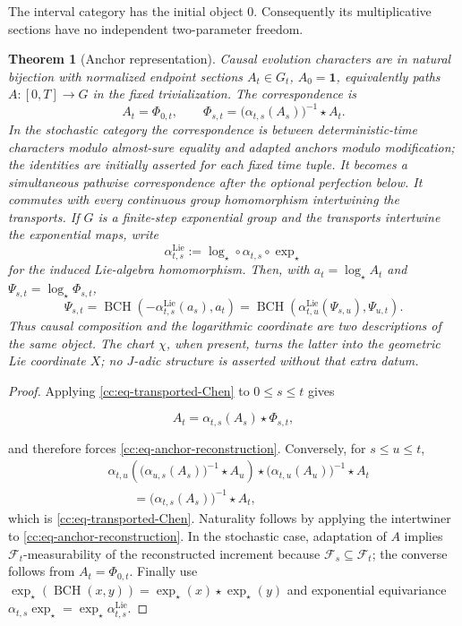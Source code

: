 \documentclass[10pt,reqno]{amsart}
\theoremstyle{plain}
\newtheorem{theorem}{Theorem}[section]
\theoremstyle{definition}
\theoremstyle{remark}
\begin{document}
The interval category has the initial object \(0\).  Consequently its
multiplicative sections have no independent two-parameter freedom.

\begin{theorem}[Anchor representation]
\label{cc:thm-anchor-representation}
Causal evolution characters are in natural bijection with normalized
endpoint sections \(A_t\in G_t\), \(A_0={\mathbf 1}\), equivalently paths
\(A:[0,T]\to G\) in the fixed trivialization.  The correspondence is
\begin{equation}
 A_t=\Phi_{0,t},
 \qquad
 \Phi_{s,t}
 =\bigl(\alpha_{t,s}(A_s)\bigr)^{-1}\star A_t.
 \label{cc:eq-anchor-reconstruction}
\end{equation}
In the stochastic category the correspondence is between deterministic-time
characters modulo almost-sure equality and adapted anchors modulo
modification; the identities are initially asserted for each fixed time
tuple.  It becomes a simultaneous pathwise correspondence after the
optional perfection below.
It commutes with every continuous group homomorphism intertwining the
transports.  If \(G\) is a finite-step exponential group and the transports
intertwine the exponential maps, write
\[
 \alpha^{\mathrm{Lie}}_{t,s}
 :=\log_\star\circ\alpha_{t,s}\circ\exp_\star
\]
for the induced Lie-algebra homomorphism.  Then, with
\(a_t=\log_\star A_t\) and \(\Psi_{s,t}=\log_\star\Phi_{s,t}\),
\begin{equation}
 \Psi_{s,t}
 ={\operatorname{BCH}}\!\left(-\alpha^{\mathrm{Lie}}_{t,s}(a_s),a_t\right)
 ={\operatorname{BCH}}\!\left(
   \alpha^{\mathrm{Lie}}_{t,u}(\Psi_{s,u}),\Psi_{u,t}\right).
 \label{cc:eq-transported-BCH}
\end{equation}
Thus causal composition and the logarithmic coordinate are two descriptions
of the same object.  The chart \(\chi\), when present, turns the latter into
the geometric Lie coordinate \(X\); no \(J\)-adic structure is asserted
without that extra datum.
\end{theorem}

\begin{proof}
Applying \eqref{cc:eq-transported-Chen} to \(0\le s\le t\) gives

\[
 A_t=\alpha_{t,s}(A_s)\star\Phi_{s,t},
\]

and therefore forces \eqref{cc:eq-anchor-reconstruction}.  Conversely,
for \(s\le u\le t\),
\begin{align*}
 &\alpha_{t,u}\!\left(
   \bigl(\alpha_{u,s}(A_s)\bigr)^{-1}\star A_u\right)
 \star\bigl(\alpha_{t,u}(A_u)\bigr)^{-1}\star A_t\\
 &\qquad=\bigl(\alpha_{t,s}(A_s)\bigr)^{-1}\star A_t,
\end{align*}
which is \eqref{cc:eq-transported-Chen}.  Naturality follows by applying
the intertwiner to \eqref{cc:eq-anchor-reconstruction}.  In the
stochastic case, adaptation of \(A\) implies
\({\mathcal F}_t\)-measurability of the reconstructed increment because
\({\mathcal F}_s\subseteq{\mathcal F}_t\); the converse follows from
\(A_t=\Phi_{0,t}\).  Finally use
\(\exp_\star({\operatorname{BCH}}(x,y))=\exp_\star(x)\star\exp_\star(y)\) and exponential
equivariance
\(\alpha_{t,s}\exp_\star
 =\exp_\star\alpha^{\mathrm{Lie}}_{t,s}\).
\end{proof}
\end{document}
